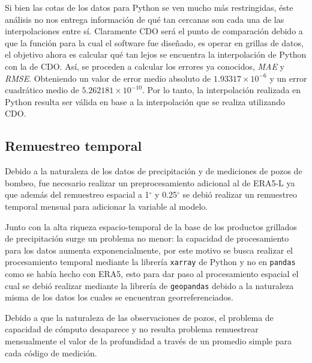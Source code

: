     Si bien las cotas de los datos para Python se ven mucho más restringidas, éste análisis no nos entrega información de qué tan cercanas son cada una de las interpolaciones entre sí. Claramente CDO será el punto de comparación debido a que
    la función para la cual el software fue diseñado, es operar en grillas de datos, el objetivo ahora es calcular qué tan lejos se encuentra la interpolación de Python con la de CDO.
    Así, se proceden a calcular los errores ya conocidos, \textit{MAE} y \textit{RMSE}. Obteniendo un valor de error medio absoluto de $1.93317\times 10^{-6}$ y un error cuadrático medio de $5.262181\times 10^{-10}$. Por lo tanto, 
    la interpolación realizada en Python resulta ser válida en base a la interpolación que se realiza utilizando CDO.


    \subsection{Remuestreo temporal}
    Debido a la naturaleza de los datos de precipitación y de mediciones de pozos de bombeo, fue necesario realizar un preprocesamiento 
    adicional al de ERA5-L ya que además del remuestreo espacial a 1$^\circ$ y 0.25$^\circ$ se debió realizar un remuestreo temporal
    mensual para adicionar la variable al modelo.

    Junto con la alta riqueza espacio-temporal de la base de los productos grillados de precipitación surge un problema no menor: la capacidad de procesamiento para los datos aumenta
    exponencialmente, por este motivo se busca realizar el procesamiento temporal mediante la librería \texttt{xarray} de Python y no en \texttt{pandas} como se había hecho con
    ERA5, esto para dar paso al procesamiento espacial el cual se debió realizar mediante la librería de \texttt{geopandas} debido a la naturaleza misma de los datos
    los cuales se encuentran georreferenciados.

    Debido a que la naturaleza de las observaciones de pozos, el problema de capacidad de cómputo desaparece y no resulta problema remuestrear mensualmente el valor de la profundidad a través de 
    un promedio simple para cada código de medición.
%   
%
%
%
%
%
%
